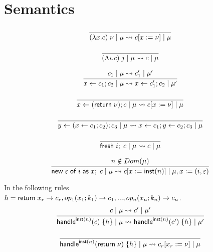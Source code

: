 \section{Semantics}

\[\frac{
	\begin{array}{l}
	\end{array}
}{
	(\lambda x . c) \; \nu \; | \; \mu \rightsquigarrow c[x := \nu] \; | \; \mu
}\]

\[\frac{
	\begin{array}{l}
	\end{array}
}{
	(\Lambda i . c) \; j \; | \; \mu \rightsquigarrow c \; | \; \mu
}\]

\[\frac{
	\begin{array}{l}
	c_1 \; | \; \mu \rightsquigarrow c_1' \; | \; \mu'
	\end{array}
}{
	x \leftarrow c_1 ; c_2 \; | \; \mu \rightsquigarrow x \leftarrow c_1' ; c_2 \; | \; \mu'
}\]

\[\frac{
	\begin{array}{l}
	\end{array}
}{
	x \leftarrow (\mathsf{return} \; \nu) ; c \; | \; \mu \rightsquigarrow c[x := \nu] \; | \; \mu
}\]

\[\frac{
	\begin{array}{l}
	\end{array}
}{
	y \leftarrow (x \leftarrow c_1 ; c_2) ; c_3 \; | \; \mu \rightsquigarrow x \leftarrow c_1 ; y \leftarrow c_2 ; c_3 \; | \; \mu
}\]

\[\frac{
	\begin{array}{l}
	\end{array}
}{
	\mathsf{fresh} \; i ;\; c \; | \; \mu \rightsquigarrow c \; | \; \mu
}\]

\[\frac{
	\begin{array}{l}
	n \notin Dom(\mu)
	\end{array}
}{
	\mathsf{new} \; \varepsilon \; \mathsf{of} \; i \; \mathsf{as} \; x ;\; c \; | \; \mu \rightsquigarrow c[x := \mathsf{inst}(n)] \; | \; \mu,x := (i, \varepsilon)
}\]

In the following rules \\$h = {
		\mathsf{return} \; x_r \rightarrow c_r,
		op_1(x_1 ; k_1) \rightarrow c_1,
		...,
		op_n(x_n ; k_n) \rightarrow c_n
}$.\\

\[\frac{
	\begin{array}{l}
	c \; | \; \mu \rightsquigarrow c' \; | \; \mu'
	\end{array}
}{
	\mathsf{handle}^{\mathsf{inst}(n)} ( c ) \; \{h\} \; | \; \mu \rightsquigarrow \mathsf{handle}^{\mathsf{inst}(n)} ( c' ) \; \{h\} \; | \; \mu'
}\]

\[\frac{
	\begin{array}{l}
	\end{array}
}{
	\mathsf{handle}^{\mathsf{inst}(n)} ( \mathsf{return} \; \nu ) \; \{h\} \; | \; \mu \rightsquigarrow c_r[x_r := \nu] \; | \; \mu
}\]

